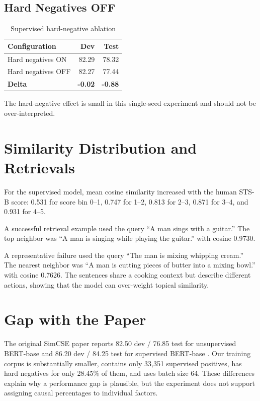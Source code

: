 \documentclass[10pt,conference]{IEEEtran}
\begin{document}
\subsection{Hard Negatives OFF}
\begin{table}[H]
\centering
\caption{Supervised hard-negative ablation}
\begin{tabular}{lrr}
\toprule
Configuration & Dev & Test \\
\midrule
Hard negatives ON & 82.29 & 78.32 \\
Hard negatives OFF & 82.27 & 77.44 \\
\textbf{Delta} & \textbf{-0.02} & \textbf{-0.88} \\
\bottomrule
\end{tabular}
\end{table}
The hard-negative effect is small in this single-seed experiment and should not be over-interpreted.

\section{Similarity Distribution and Retrievals}
For the supervised model, mean cosine similarity increased with the human STS-B score: 0.531 for score bin 0--1, 0.747 for 1--2, 0.813 for 2--3, 0.871 for 3--4, and 0.931 for 4--5.

A successful retrieval example used the query ``A man sings with a guitar.'' The top neighbor was ``A man is singing while playing the guitar.'' with cosine 0.9730.

A representative failure used the query ``The man is mixing whipping cream.'' The nearest neighbor was ``A man is cutting pieces of butter into a mixing bowl.'' with cosine 0.7626. The sentences share a cooking context but describe different actions, showing that the model can over-weight topical similarity.

\section{Gap with the Paper}
The original SimCSE paper reports 82.50 dev / 76.85 test for unsupervised BERT-base and 86.20 dev / 84.25 test for supervised BERT-base \cite{gao2021}. Our training corpus is substantially smaller, contains only 33,351 supervised positives, has hard negatives for only 28.45\% of them, and uses batch size 64. These differences explain why a performance gap is plausible, but the experiment does not support assigning causal percentages to individual factors.
\end{document}
